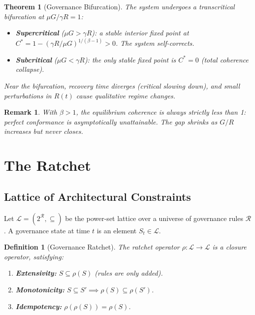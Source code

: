 \documentclass[11pt, a4paper, logo, copyright]{googledeepmind}
\newtheorem{definition}{Definition}[section]
\newtheorem{theorem}{Theorem}[section]
\newtheorem*{remark}{Remark}
\begin{document}
\begin{theorem}[Governance Bifurcation]
\label{thm:bifurcation}
The system undergoes a transcritical bifurcation at $\mu G / \gamma R = 1$:
\begin{itemize}
    \item \textbf{Supercritical} ($\mu G > \gamma R$): a stable interior fixed point at $C^* = 1 - (\gamma R / \mu G)^{1/(\beta-1)} > 0$. The system self-corrects.
    \item \textbf{Subcritical} ($\mu G < \gamma R$): the only stable fixed point is $C^* = 0$ (total coherence collapse).
\end{itemize}
Near the bifurcation, recovery time diverges (critical slowing down), and small perturbations in $R(t)$ cause qualitative regime changes.
\end{theorem}

\begin{remark}
With $\beta > 1$, the equilibrium coherence is always strictly less than 1: perfect conformance is asymptotically unattainable. The gap shrinks as $G/R$ increases but never closes.
\end{remark}


\section{The Ratchet}
\label{sec:ratchet}

\subsection{Lattice of Architectural Constraints}

Let $\mathcal{L} = (2^{\mathcal{R}}, \subseteq)$ be the power-set lattice over a universe of governance rules $\mathcal{R}$. A governance state at time $t$ is an element $S_t \in \mathcal{L}$.

\begin{definition}[Governance Ratchet]
\label{def:ratchet}
The ratchet operator $\rho: \mathcal{L} \to \mathcal{L}$ is a \emph{closure operator}, satisfying:
\begin{enumerate}
    \item \textbf{Extensivity:} $S \subseteq \rho(S)$ (rules are only added).
    \item \textbf{Monotonicity:} $S \subseteq S' \implies \rho(S) \subseteq \rho(S')$.
    \item \textbf{Idempotency:} $\rho(\rho(S)) = \rho(S)$.
\end{enumerate}
\end{definition}
\end{document}
